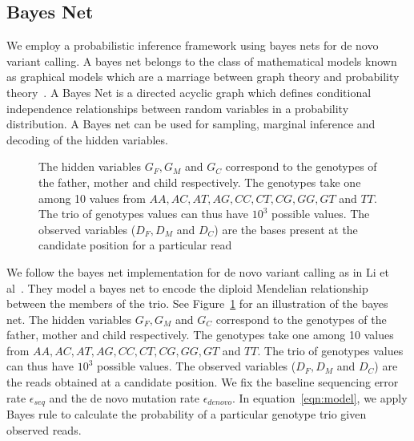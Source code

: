 \documentclass{article}
\begin{document}
\subsection{Bayes Net}
We employ a probabilistic inference framework using bayes nets for de novo variant calling. A bayes net belongs to the class of mathematical models known as graphical models which are a marriage between graph theory and probability theory~\cite{Jordan2008}. A Bayes Net is a directed acyclic graph which defines conditional independence relationships between random variables in a probability distribution. A Bayes net can be used for sampling, marginal inference and decoding of the hidden variables. 

\begin{figure}
\centering
{}
\caption{The hidden variables $G_{F}, G_{M}$ and $G_{C}$ correspond to the genotypes of the father, mother and child respectively. The genotypes take one among 10 values from $AA, AC, AT, AG, CC, CT, CG, GG, GT$ and $TT$. The trio of genotypes values can thus have $10^3$ possible values. The observed variables ($D_F, D_M$ and $D_C$) are the bases present at the candidate position for a particular read }
\label{fig:bayesnet}
\end{figure}

\vspace{5mm} 
We follow the bayes net implementation for de novo variant calling as in Li et al~\cite{Li2012}. They model a bayes net to encode the diploid Mendelian relationship between the members of the trio. See Figure~\ref{fig:bayesnet} for an illustration of the bayes net. The hidden variables $G_{F}, G_{M}$ and $G_{C}$ correspond to the genotypes of the father, mother and child respectively. The genotypes take one among 10 values from $AA, AC, AT, AG, CC, CT, CG, GG, GT$ and $TT$. The trio of genotypes values can thus have $10^3$ possible values. The observed variables ($D_F, D_M$ and $D_C$) are the reads obtained at a candidate position. We fix the baseline sequencing error rate $\epsilon_{seq}$ and the de novo mutation rate $\epsilon_{denovo}$. In equation~\ref{eqn:model}, we apply Bayes rule to calculate the probability of a particular genotype trio given observed reads.
\end{document}
